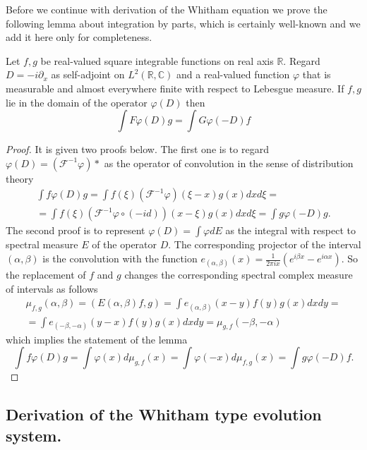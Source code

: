 %
Before we continue with derivation of the Whitham equation we prove
the following lemma about integration by parts, which is certainly
well-known and we add it here only for completeness.
%
\begin{lemma}
\label{integration_by_parts}
	Let $f, g$ be real-valued square integrable functions
	on real axis $\mathbb R$.
	Regard $D = -i \partial_x$ as self-adjoint on $L^2(\mathbb R, \mathbb C)$
	and a real-valued function $\varphi$ that is measurable and
	almost everywhere finite with respect to Lebesgue measure.
	If $f, g$ lie in the domain of the operator $\varphi(D)$ then
	\[
		\int F \varphi(D) g = \int G \varphi(-D) f 
	\]
\end{lemma}
%
\begin{proof}
	It is given two proofs below.
	The first one is to regard 
	\(
		\varphi(D) = ( \mathcal F^{-1} \varphi ) *
	\)
	as	the operator of convolution
	in the sense of distribution theory
	\begin{multline*}
		\int f \varphi(D) g
		= 
		\int f(\xi) ( \mathcal F^{-1} \varphi ) (\xi - x) g(x) dx d\xi
		=
		\\
		= 
		\int f(\xi) ( \mathcal F^{-1} \varphi \circ (-id) ) (x - \xi) g(x) dx d\xi
		=		
		\int g \varphi(-D) g
		.	
	\end{multline*}
	The second proof is to represent
	\(
		\varphi(D) = \int \varphi dE
	\)
	as the integral with respect to spectral measure $E$
	of the operator $D$.
	The corresponding projector of the interval $(\alpha, \beta)$
	is the convolution with the function
	\(
		e _{(\alpha, \beta)}(x) =
		\frac{1}{2 \pi ix} ( e^{i \beta x} - e^{i \alpha x} )
	\).
	So the replacement of $f$ and $g$ changes the corresponding spectral
	complex measure of intervals as follows
	\begin{multline*}
		\mu _{f,g}(\alpha, \beta)
		=
		(E(\alpha, \beta)f,g)
		=
		\int e _{(\alpha, \beta)}(x-y) f(y) g(x) dxdy
		=
		\\
		=
		\int e _{(-\beta, -\alpha)}(y-x) f(y) g(x) dxdy
		=
		\mu _{g,f}(-\beta, -\alpha)
	\end{multline*}
	which implies the statement of the lemma
	\[
		\int f \varphi(D) g
		= 
		\int \varphi (x)d\mu _{g,f}(x)
		=
		\int \varphi (-x)d\mu _{f,g}(x)
		=		
		\int g \varphi(-D) f
		.	
	\]
\end{proof}


\subsection{Derivation of the Whitham type evolution system.}
%
%

